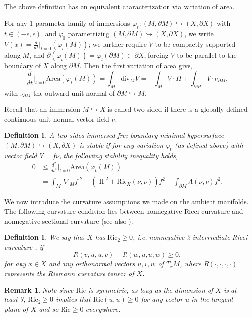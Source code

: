 \documentclass[12pt]{amsart}
\newcommand{\sff}{\mathrm{I\!I}}
\newcommand{\Ric}{\text{Ric}}
\newcommand{\dive}{\text{div}}
\newcommand{\p}{\partial}
\newtheorem{definition}[theorem]{Definition}
\newtheorem{remark}[theorem]{Remark}
\numberwithin{equation}{section}
\begin{document}
    The above definition has an equivalent characterization via variation of area.
 
    For any 1-parameter family of immersions $\varphi_t:(M,\p M) \hookrightarrow (X,\p X)$ with $t\in (-\epsilon,\epsilon)$, and $\varphi_0$ parametrizing $(M,\p M)\hookrightarrow (X,\p X)$, we write $V(x)=\frac{d}{dt}\vert_{t=0}(\varphi_t(M))$; we further require $V$ to be compactly supported along $M$, and $\p (\varphi_t(M))=\varphi_t(\p M)\subset \p X$, forcing $V$ to be parallel to the boundary of $X$ along $\p M$. Then the first  variation of area give,
    \begin{equation}
        \frac{d}{dt}\Big\vert_{t=0} \text{Area}(\varphi_t(M))=\int_M \dive_{M} V =-\int_M V\cdot H+\int_{\p M} V\cdot \nu_{\p M},
    \end{equation}
    with $\nu_{\p M}$ the outward unit normal of $\p M \hookrightarrow M$.

    Recall that an immersion $M\hookrightarrow X$ is called two-sided if there is a globally defined continuous unit normal vector field $\nu$.

    \begin{definition}
        A two-sided immersed free boundary minimal hypersurface $(M,\p M) \hookrightarrow (X,\p X)$ is stable if for any variation $\varphi_t$ (as defined above)  with vector field $V=f\nu$, the following stability inequality holds,
        \begin{align}
            0&\leq \frac{d^2}{dt^2}\Big\vert_{t=0} \text{Area}(\varphi_t(M))\\
            &=\int_M |\nabla_M f|^2-(|\sff|^2+\Ric_X(\nu,\nu))f^2-\int_{\p M}A(\nu,\nu)f^2.
        \end{align}
    \end{definition}



    We now introduce the curvature assumptions we made on the ambient manifolds. 
	The following curvature condition lies between nonnegative Ricci curvature and nonnegative sectional curvature (see also \cite{ChodoLiStryk2022-CompleteStableMinimal}). 
    \begin{definition}
        We say that $X$ has $\Ric_2 \geq 0$, i.e. nonnegative 2-intermediate Ricci curvature , if
	\begin{equation}
		R(v,u,u,v)+R(w,u,u,w)\geq 0,
	\end{equation} 
	for any $x\in X$ and any orthonormal vectors $u,v,w$ of $T_xM$, where $R(\cdot,\cdot,\cdot,\cdot)$ represents the Riemann curvature tensor of $X$. 
    \end{definition}
    \begin{remark}
        Note since $\Ric$ is symmetric, as long as the dimension of $X$ is  at least 3, $\Ric_2 \geq 0$ implies that $\Ric(u,u) \geq 0$ for any vector $u$ in the tangent plane of $X$ and so $\Ric \geq 0$ everywhere.
    \end{remark}
\end{document}
